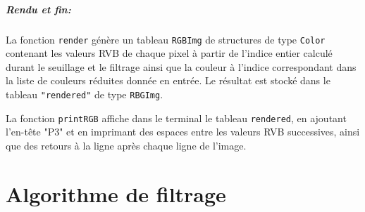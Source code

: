 \documentclass[a4paper, 11pt]{article}
\begin{document}
\subparagraph{\textit{Rendu et fin:}} La fonction \texttt{render} génère un tableau \texttt{RGBImg} de structures de type \texttt{Color} contenant les valeurs RVB de chaque pixel à partir de l'indice entier calculé durant le seuillage et le filtrage ainsi que la couleur à l'indice correspondant dans la liste de couleurs réduites donnée en entrée. Le résultat est stocké dans le tableau \texttt{"rendered"} de type \texttt{RBGImg}.

La fonction \texttt{printRGB} affiche dans le terminal le tableau \texttt{rendered}, en ajoutant l'en-tête "P3" et en imprimant des espaces entre les valeurs RVB successives, ainsi que des retours à la ligne après chaque ligne de l'image.

\newpage
\section*{Algorithme de filtrage}
\end{document}
